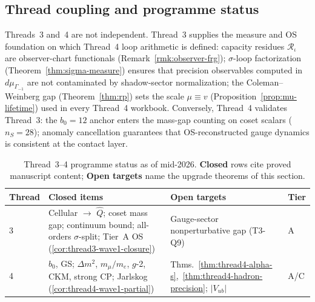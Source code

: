 \subsection{Thread coupling and programme status}
\label{sec:threads-3-4-coupling}

Threads~3 and~4 are not independent. Thread~3 supplies the measure and OS
foundation on which Thread~4 loop arithmetic is defined: capacity residues
$\mathcal{R}_\iota$ are observer-chart functionals
(Remark~\ref{rmk:observer-frg}); $\sigma$-loop factorization
(Theorem~\ref{thm:sigma-measure}) ensures that precision observables computed
in $d\mu_{\Gamma_{-1}}$ are not contaminated by shadow-sector normalization;
the Coleman--Weinberg gap (Theorem~\ref{thm:rp}) sets the scale
$\mu\equiv v$ (Proposition~\ref{prop:mu-lifetime}) used in every Thread~4
workbook. Conversely, Thread~4 validates Thread~3: the $b_0=12$ anchor enters
the mass-gap counting on coset scalars ($n_S=28$); anomaly cancellation
guarantees that OS-reconstructed gauge dynamics is consistent at the contact
layer.

\begin{table}[ht]
\centering
\small
\renewcommand{\arraystretch}{1.12}
\begin{tabular}{@{}llll@{}}
\toprule
\textbf{Thread} & \textbf{Closed items} & \textbf{Open targets} & \textbf{Tier} \\
\midrule
3 &
  Cellular $\to$ $\hat Q$; coset mass gap; continuum bound;
  all-orders $\sigma$-split; Tier~A OS (\ref{cor:thread3-wave1-closure}) &
  Gauge-sector nonperturbative gap (T3-Q9) &
  A \\
4 &
  $b_0$, GS; $\Delta m^2$, $m_\mu/m_e$, $g$-2, CKM, strong CP;
  Jarlskog (\ref{cor:thread4-wave1-partial}) &
  Thms.~\ref{thm:thread4-alpha-s},~\ref{thm:thread4-hadron-precision};
  $|V_{ub}|$ &
  A/C \\
\bottomrule
\end{tabular}
\caption{Thread~3--4 programme status as of mid-2026. \textbf{Closed} rows
cite proved manuscript content; \textbf{Open targets} name the upgrade
theorems of this section.}
\label{tab:threads-3-4-status}
\end{table}


